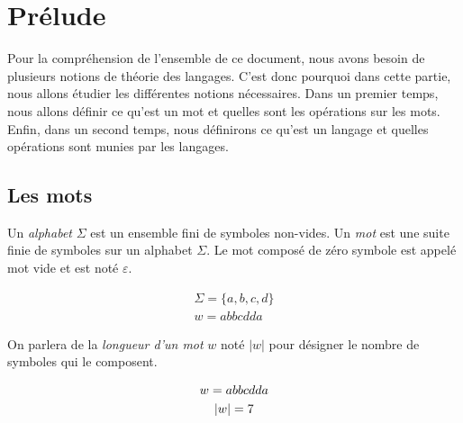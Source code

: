 \section{Prélude}

Pour la compréhension de l'ensemble de ce document, nous avons besoin de
plusieurs notions de théorie des langages. C'est donc pourquoi dans cette
partie, nous allons étudier les différentes notions nécessaires. Dans un
premier temps, nous allons définir ce qu'est un mot et quelles sont les
opérations sur les mots. Enfin, dans un second temps, nous définirons ce qu'est
un langage et quelles opérations sont munies par les langages.

\subsection{Les mots}

\begin{definition}
    Un \textit{alphabet} \(\Sigma\) est un ensemble fini de symboles non-vides.
    Un \textit{mot} est une suite finie de symboles sur un alphabet \(\Sigma\).
    Le mot composé de zéro symbole est appelé mot vide et est noté
    \(\varepsilon\).
\end{definition}

\begin{example}
    \begin{gather*}
        \Sigma = \{a, b, c, d\} \\
        w = abbcdda
    \end{gather*}
\end{example}

\begin{definition}
    On parlera de la \textit{longueur d'un mot} \(w\) noté \(|w|\) pour
    désigner le nombre de symboles qui le composent. %
\end{definition}

\begin{example}
    \begin{gather*}
        w = abbcdda \notag \\
        |w| = 7 \\
    \end{gather*}
\end{example}


